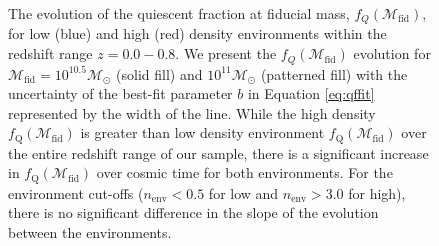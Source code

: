 \documentclass{emulateapj}
\begin{document}
\begin{figure}
    \begin{center}
        \leavevmode
        \caption{The evolution of the quiescent fraction at fiducial
          mass, $f_{Q}(\mathcal{M}_{\mathrm{fid}})$, for low (blue) and
          high (red) density environments within the redshift range $z
          = 0.0 - 0.8$. We present the $f_{Q}(\mathcal{M}_{\mathrm{fid}})$
          evolution for $\mathcal{M}_{\mathrm{fid}} = 10^{10.5}
          \mathcal{M}_\odot$ (solid fill) and $10^{11}
          \mathcal{M}_\odot$ (patterned fill) with the uncertainty of
          the best-fit parameter $b$ in Equation \ref{eq:qffit}
          represented by the width of the line. While the high density $f_{\mathrm{Q}}(\mathcal{M}_{\mathrm{fid}})$ is greater than low density environment $f_{\mathrm{Q}}(\mathcal{M}_{\mathrm{fid}})$ over the entire redshift range of our sample, there is a significant increase in $f_{\mathrm{Q}}(\mathcal{M}_{\mathrm{fid}})$ over cosmic time for both environments. For the environment cut-offs ($n_{\mathrm{env}} < 0.5$ for low and $n_{\mathrm{env}} > 3.0$ for high), there is no significant difference in the slope of the evolution between the environments.}         \label{fig:qffit}
    \end{center}
\end{figure}
\end{document}
